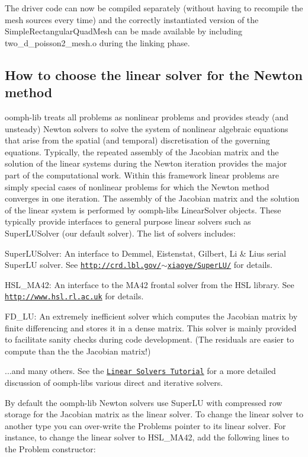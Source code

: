 The driver code can now be compiled separately (without having to recompile the mesh sources every time) and the correctly instantiated version of the {\ttfamily Simple\+Rectangular\+Quad\+Mesh} can be made available by including {\ttfamily two\+\_\+d\+\_\+poisson2\+\_\+mesh.\+o} during the linking phase.\hypertarget{index_different_solvers}{}\subsection{How to choose the linear solver for the Newton method}\label{index_different_solvers}
{\ttfamily oomph-\/lib} treats all problems as nonlinear problems and provides steady (and unsteady) Newton solvers to solve the system of nonlinear algebraic equations that arise from the spatial (and temporal) discretisation of the governing equations. Typically, the repeated assembly of the Jacobian matrix and the solution of the linear systems during the Newton iteration provides the major part of the computational work. Within this framework linear problems are simply special cases of nonlinear problems for which the Newton method converges in one iteration. The assembly of the Jacobian matrix and the solution of the linear system is performed by {\ttfamily oomph-\/lib\textquotesingle{}s} {\ttfamily Linear\+Solver} objects. These typically provide interfaces to general purpose linear solvers such as {\ttfamily Super\+L\+U\+Solver} (our default solver). The list of solvers includes\+:
\begin{DoxyItemize}
\item {\ttfamily Super\+L\+U\+Solver\+:} An interface to Demmel, Eistenstat, Gilbert, Li \& Liu\textquotesingle{}s serial Super\+LU solver. See \href{http://crd.lbl.gov/~xiaoye/SuperLU/}{\tt http\+://crd.\+lbl.\+gov/$\sim$xiaoye/\+Super\+L\+U/} for details.
\item {\ttfamily H\+S\+L\+\_\+\+M\+A42\+:} An interface to the M\+A42 frontal solver from the H\+SL library. See \href{http://www.hsl.rl.ac.uk/}{\tt http\+://www.\+hsl.\+rl.\+ac.\+uk} for details.
\item {\ttfamily F\+D\+\_\+\+LU\+:} An extremely inefficient solver which computes the Jacobian matrix by finite differencing and stores it in a dense matrix. This solver is mainly provided to facilitate sanity checks during code development. (The residuals are easier to compute than the the Jacobian matrix!)
\item ...and many others. See the \href{../../../linear_solvers/html/index.html}{\tt Linear Solvers Tutorial} for a more detailed discussion of {\ttfamily oomph-\/lib\textquotesingle{}s} various direct and iterative solvers.
\end{DoxyItemize}By default the {\ttfamily oomph-\/lib} Newton solvers use {\ttfamily Super\+LU} with compressed row storage for the Jacobian matrix as the linear solver. To change the linear solver to another type you can over-\/write the {\ttfamily Problem\textquotesingle{}s} pointer to its linear solver. For instance, to change the linear solver to {\ttfamily H\+S\+L\+\_\+\+M\+A42}, add the following lines to the {\ttfamily Problem} constructor\+:


